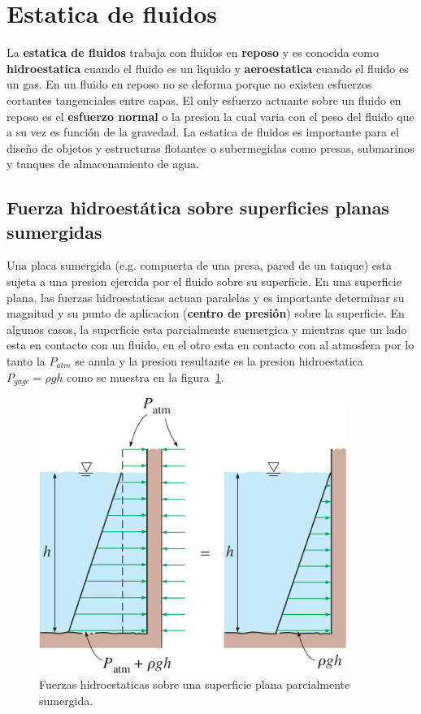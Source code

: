 \documentclass[10pt, oneside]{article}
\begin{document}
\section{Estatica de fluidos}
La \textbf{estatica de fluidos} trabaja con fluidos en \textbf{reposo} y es conocida como \textbf{hidroestatica} cuando el fluido es un liquido y \textbf{aeroestatica} cuando el fluido es un gas. En un fluido en reposo no se deforma porque no existen esfuerzos cortantes tangenciales entre capas. El only esfuerzo actuante sobre un fluido en reposo es el \textbf{esfuerzo normal} o la presion la cual varia con el peso del fluido que a su vez es funci\'on de la gravedad. La estatica de fluidos es importante para el dise\~no de objetos y estructuras flotantes o subermegidas como presas, submarinos y tanques de almacenamiento de agua.
\subsection{Fuerza hidroest\'atica sobre superficies planas sumergidas}
Una placa sumergida (e.g. compuerta de una presa, pared de un tanque) esta sujeta a una presion ejercida por el fluido sobre su superficie. En una superficie plana, las fuerzas hidroestaticas actuan paralelas y es importante determinar su magnitud y su punto de aplicacion (\textbf{centro de presi\'on}) sobre la superficie. En algunos casos, la superficie esta parcialmente suemergica y mientras que un lado esta en contacto con un fluido, en el otro esta en contacto con al atmosfera por lo tanto la $P_{atm}$ se anula y la presion resultante es la presion hidroestatica $P_{gage}=\rho g h$ como se muestra en la figura~\ref{hes1}.

\begin{figure}[h]
\centering
\includegraphics[width=10cm]{hes1}
\caption{Fuerzas hidroestaticas sobre una superficie plana parcialmente sumergida.}
\label{hes1}
\end{figure}
\end{document}
